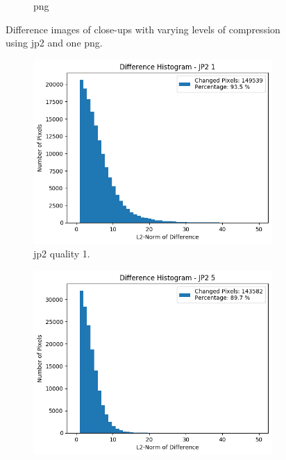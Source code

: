 \begin{figure}[htb]
\begin{subfigure}[b]{0.49\textwidth}
            \caption{\gls{png}}
            \label{fig:img_quality_center_heatmap_png}
        \end{subfigure}
    \caption{Difference images of close-ups with varying levels of compression using \gls{jp2} and one \gls{png}.}
    \label{fig:img_quality_center_heatmap}
\end{figure}

\begin{figure}[htb]
    \centering
        \begin{subfigure}[b]{0.49\textwidth}
            \centering
            \includegraphics[width=\textwidth]{doc/thesis/0_figures/compare_quality/set1/jp2_1_center_diff_histogram.png}
            \caption{\gls{jp2} quality 1.}
            \label{fig:img_quality_center_histogram_1}
        \end{subfigure}
        \begin{subfigure}[b]{0.49\textwidth}
            \centering
            \includegraphics[width=\textwidth]{doc/thesis/0_figures/compare_quality/set1/jp2_5_center_diff_histogram.png}

\end{subfigure}
\end{figure}
